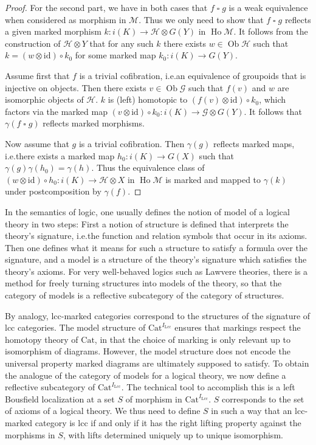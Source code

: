 \documentclass[a4paper]{article}
\theoremstyle{remark}
\theoremstyle{definition}
\begin{document}
\begin{proof}
  For the second part, we have in both cases that $f \mathbin{\square} g$ is a weak equivalence when considered as morphism in $\mathcal{M}$.
  Thus we only need to show that $f \mathbin{\square} g$ reflects a given marked morphism $k : i(K) \rightarrow \mathcal{H} \otimes G(Y)$ in $\operatorname{Ho} \mathcal{M}$.
  It follows from the construction of $\mathcal{H} \otimes Y$ that for any such $k$ there exists $w \in \operatorname{Ob} \mathcal{H}$ such that $k = (w \otimes \mathrm{id}) \circ k_0$ for some marked map $k_0 : i(K) \rightarrow G(Y)$.

  Assume first that $f$ is a trivial cofibration, i.e.\@ an equivalence of groupoids that is injective on objects.
  Then there exists $v \in \operatorname{Ob} \mathcal{G}$ such that $f(v)$ and $w$ are isomorphic objects of $\mathcal{H}$.
  $k$ is (left) homotopic to $(f(v) \otimes \mathrm{id}) \circ k_0$, which factors via the marked map $(v \otimes \mathrm{id}) \circ k_0 : i(K) \rightarrow \mathcal{G} \otimes G(Y)$.
  It follows that $\gamma(f \mathbin{\square} g)$ reflects marked morphisms.

  Now assume that $g$ is a trivial cofibration.
  Then $\gamma(g)$ reflects marked maps, i.e.\@ there exists a marked map $h_0 : i(K) \rightarrow G(X)$ such that $\gamma(g)\gamma(h_0) = \gamma(h)$.
  Thus the equivalence class of $(w \otimes \mathrm{id}) \circ h_0 : i(K) \rightarrow \mathcal{H} \otimes X$ in $\operatorname{Ho} \mathcal{M}$ is marked and mapped to $\gamma(k)$ under postcomposition by $\gamma(f)$.
\end{proof}

In the semantics of logic, one usually defines the notion of model of a logical theory in two steps:
First a notion of structure is defined that interprets the theory's signature, i.e.\@ the function and relation symbols that occur in its axioms.
Then one defines what it means for such a structure to satisfy a formula over the signature, and a model is a structure of the theory's signature which satisfies the theory's axioms.
For very well-behaved logics such as Lawvere theories, there is a method for freely turning structures into models of the theory, so that the category of models is a reflective subcategory of the category of structures.

By analogy, lcc-marked categories correspond to the structures of the signature of lcc categories.
The model structure of $\mathrm{Cat}^{I_\mathrm{Lcc}}$ ensures that markings respect the homotopy theory of $\mathrm{Cat}$, in that the choice of marking is only relevant up to isomorphism of diagrams.
However, the model structure does not encode the universal property marked diagrams are ultimately supposed to satisfy.
To obtain the analogue of the category of models for a logical theory, we now define a reflective subcategory of $\mathrm{Cat}^{I_\mathrm{Lcc}}$.
The technical tool to accomplish this is a left Bousfield localization at a set $S$ of morphism in $\mathrm{Cat}^{I_\mathrm{Lcc}}$.
$S$ corresponds to the set of axioms of a logical theory.
We thus need to define $S$ in such a way that an lcc-marked category is lcc if and only if it has the right lifting property against the morphisms in $S$, with lifts determined uniquely up to unique isomorphism.
\end{document}
